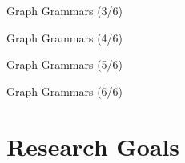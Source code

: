 \documentclass{FMTslides}
\begin{document}
\begin{frame}{Graph Grammars (3/6)}
\begin{figure}
\centering
  
\end{figure}
\end{frame}

\begin{frame}{Graph Grammars (4/6)}
\begin{figure}
\centering
  
\end{figure}
\end{frame}

\begin{frame}{Graph Grammars (5/6)}
\begin{figure}
\centering
  
\end{figure}
\end{frame}

\begin{frame}{Graph Grammars (6/6)}
\begin{figure}
\centering
  
\end{figure}
\end{frame}

\section{Research Goals}
\end{document}
